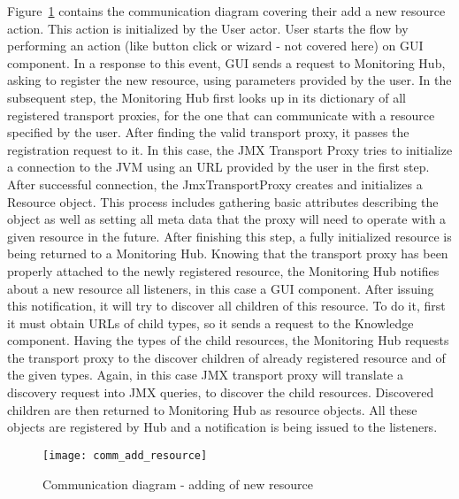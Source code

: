Figure~\ref{fig:comm_add_resource} contains the communication diagram covering their add a new resource action. This action is initialized by the User actor. User starts the flow by performing an action (like button click or wizard - not covered here) on GUI component. In a response to this event, GUI sends a request to Monitoring Hub, asking to register the new resource, using parameters provided by the user. In the subsequent step, the Monitoring Hub first looks up in its dictionary of all registered transport proxies, for the one that can communicate with a resource specified by the user. After finding the valid transport proxy, it passes the registration request to it. In this case, the JMX Transport Proxy tries to initialize a connection to the JVM using an URL provided by the user in the first step. After successful connection, the JmxTransportProxy creates and initializes a Resource object. This process includes gathering basic attributes describing the object as well as setting all meta data that the proxy will need to operate with  a given resource in the future. After finishing this step, a fully initialized resource is being returned to a Monitoring Hub. Knowing that the transport proxy has been properly attached to the newly registered resource, the Monitoring Hub notifies about a new resource all listeners, in this case a GUI component. After issuing this notification, it will try to discover all children of this resource. To do it, first it must obtain URLs of child types, so it sends a request to the Knowledge component. Having the types of the child resources, the Monitoring Hub requests the transport proxy to the discover children of already registered resource and of the given types. Again, in this case JMX transport proxy will translate a discovery request into JMX queries, to discover the child resources. Discovered children are then returned to Monitoring Hub as resource objects. All these objects are registered by Hub and a notification is being issued to the listeners.

\begin{figure}[ht]
\centering
\texttt{[image: comm\_add\_resource]}
\caption{Communication diagram - adding of new resource}
\label{fig:comm_add_resource}
\end{figure}

